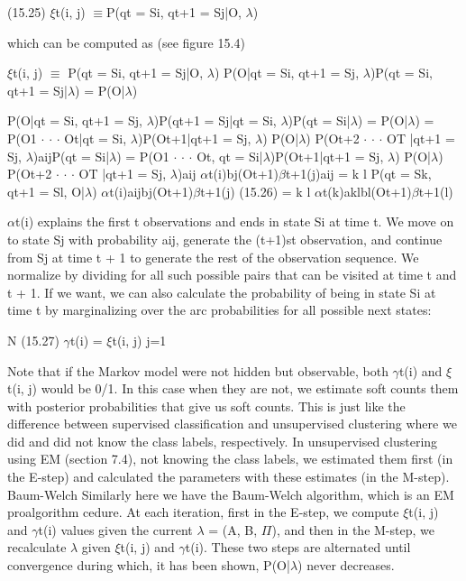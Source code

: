 (15.25) $\xi$t(i, j) $\equiv$P(qt = Si, qt+1 = Sj|O, $\lambda$)

which can be computed as (see figure 15.4)

$\xi$t(i, j) $\equiv$ P(qt = Si, qt+1 = Sj|O, $\lambda$) P(O|qt = Si, qt+1 = Sj, $\lambda$)P(qt = Si, qt+1 = Sj|$\lambda$) = P(O|$\lambda$)

P(O|qt = Si, qt+1 = Sj, $\lambda$)P(qt+1 = Sj|qt = Si, $\lambda$)P(qt = Si|$\lambda$) = P(O|$\lambda$) = P(O1 $\cdot$ $\cdot$ $\cdot$ Ot|qt = Si, $\lambda$)P(Ot+1|qt+1 = Sj, $\lambda$) P(O|$\lambda$) P(Ot+2 $\cdot$ $\cdot$ $\cdot$ OT |qt+1 = Sj, $\lambda$)aijP(qt = Si|$\lambda$) = P(O1 $\cdot$ $\cdot$ $\cdot$ Ot, qt = Si|$\lambda$)P(Ot+1|qt+1 = Sj, $\lambda$) P(O|$\lambda$) P(Ot+2 $\cdot$ $\cdot$ $\cdot$ OT |qt+1 = Sj, $\lambda$)aij $\alpha$t(i)bj(Ot+1)$\beta$t+1(j)aij = k l P(qt = Sk, qt+1 = Sl, O|$\lambda$) $\alpha$t(i)aijbj(Ot+1)$\beta$t+1(j) (15.26) = k l $\alpha$t(k)aklbl(Ot+1)$\beta$t+1(l)

$\alpha$t(i) explains the first t observations and ends in state Si at time t. We move on to state Sj with probability aij, generate the (t+1)st observation, and continue from Sj at time t + 1 to generate the rest of the observation sequence. We normalize by dividing for all such possible pairs that can be visited at time t and t + 1. If we want, we can also calculate the probability of being in state Si at time t by marginalizing over the arc probabilities for all possible next states:

N (15.27) $\gamma$t(i) = $\xi$t(i, j) j=1

Note that if the Markov model were not hidden but observable, both $\gamma$t(i) and $\xi$t(i, j) would be 0/1. In this case when they are not, we estimate soft counts them with posterior probabilities that give us soft counts. This is just like the difference between supervised classification and unsupervised clustering where we did and did not know the class labels, respectively. In unsupervised clustering using EM (section 7.4), not knowing the class labels, we estimated them first (in the E-step) and calculated the parameters with these estimates (in the M-step). Baum-Welch Similarly here we have the Baum-Welch algorithm, which is an EM proalgorithm cedure. At each iteration, first in the E-step, we compute $\xi$t(i, j) and $\gamma$t(i) values given the current $\lambda$ = (A, B, $\Pi$), and then in the M-step, we recalculate $\lambda$ given $\xi$t(i, j) and $\gamma$t(i). These two steps are alternated until convergence during which, it has been shown, P(O|$\lambda$) never decreases.

